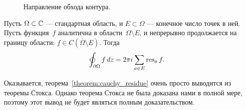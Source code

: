 \documentclass[../complex-analysis.tex]{subfiles}
\begin{document}
\begin{figure}[ht]
 \centering
 \caption{Направление обхода контура.}
 \label{fig:region-traversal-direction}
\end{figure}

\begin{thm}
 \label{theorem:cauchy_residue}
 Пусть $ \Omega \subset \mathbb{C}$ --- стандартная область, и $ E \subset \Omega $ --- конечное число точек в ней. Пусть функция~$ f $ аналитична в области~$ \Omega \setminus E $, и непрерывно продолжается на границу области: $ f\in C(\overline\Omega \setminus E) $. Тогда
 \begin{align}
  \label{eq:Cauchy Residue Theorem}
  \varointctrclockwise_{\partial \Omega} f\,dz = 2\pi i \sum_{a \in E} \residue_{a} f.
 \end{align}
\end{thm}

Оказывается, теорема~\ref{theorem:cauchy_residue} очень просто выводится из теоремы Стокса. Однако теорема Стокса не была доказана нами в полной мере, поэтому этот вывод не будет являться полным доказательством.
\end{document}
